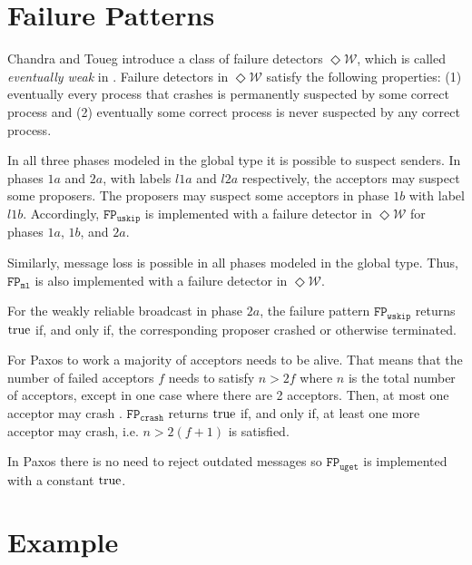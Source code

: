 \section{Failure Patterns}
\newcommand{\FPuget}[0]{\mathtt{FP_{uget}}}
\newcommand{\FPuskip}[0]{\mathtt{FP_{uskip}}}
\newcommand{\FPml}[0]{\mathtt{FP_{ml}}}
\newcommand{\FPwskip}[0]{\mathtt{FP_{wskip}}}
\newcommand{\FPcrash}[0]{\mathtt{FP_{crash}}}
\newcommand{\EventuallyWeak}[0]{\Diamond\mathscr{W}}
Chandra and Toueg introduce a class of failure detectors $\EventuallyWeak$, which is called \emph{eventually weak} in \cite{failure_detectors}.
Failure detectors in $\EventuallyWeak$ satisfy the following properties: (1) eventually every process that crashes is permanently suspected by some correct process and (2) eventually some correct process is never suspected by any correct process.

In all three phases modeled in the global type it is possible to suspect senders.
In phases $1a$ and $2a$, with labels $l1a$ and $l2a$ respectively, the acceptors may suspect some proposers.
The proposers may suspect some acceptors in phase $1b$ with label $l1b$.
Accordingly, $\FPuskip$ is implemented with a failure detector in $\EventuallyWeak$ for phases $1a$, $1b$, and $2a$.

Similarly, message loss is possible in all phases modeled in the global type.
Thus, $\FPml$ is also implemented with a failure detector in $\EventuallyWeak$.

For the weakly reliable broadcast in phase $2a$, the failure pattern $\FPwskip$ returns $\operatorname{true}$ if, and only if, the corresponding proposer crashed or otherwise terminated.

For Paxos to work a majority of acceptors needs to be alive.
That means that the number of failed acceptors $f$ needs to satisfy $n > 2f$ where $n$ is the total number of acceptors, except in one case where there are 2 acceptors.
Then, at most one acceptor may crash \cite{lower_bounds}.
$\FPcrash$ returns $\operatorname{true}$ if, and only if, at least one more acceptor may crash, i.e. $n > 2(f + 1)$ is satisfied.

In Paxos there is no need to reject outdated messages so $\FPuget$ is implemented with a constant $\operatorname{true}$.


\section{Example}
\newcommand{\Nu}[1]{\left(\nu #1\right)}
\newcommand{\OuterSessionQueues}[0]{\ParallelFor{1 \le k,l \le 2, k \neq l} t_{k\to l}:[]}
\newcommand{\InnerSessionQueues}[1]{\ParallelFor{1 \le k,l \le 4, k \neq l} #1_{k\to l}:[]}
\newcommand{\NuChannels}[0]{\Nu{t}\Nu{s}\Nu{r}}

